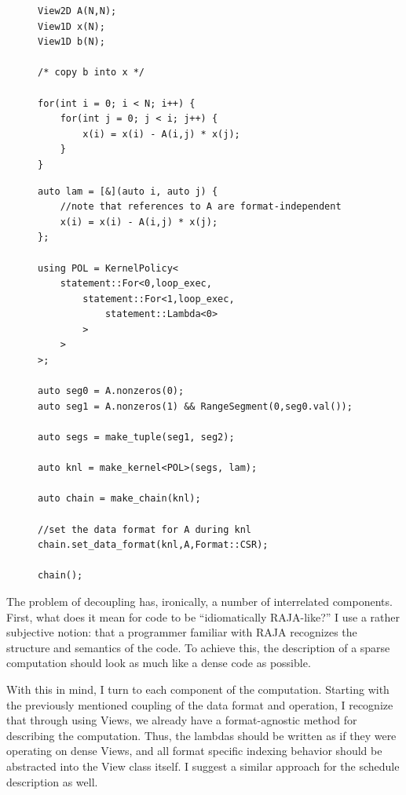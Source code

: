 \documentclass{article}
\begin{document}
\begin{figure}
\begin{lstlisting}[label={ForwardSolveC},caption={C-like implementation of forward substitution using Views}]
View2D A(N,N);
View1D x(N);
View1D b(N);

/* copy b into x */

for(int i = 0; i < N; i++) {
    for(int j = 0; j < i; j++) {
        x(i) = x(i) - A(i,j) * x(j);
    }
}
\end{lstlisting}
\end{figure}


\begin{figure}
\begin{lstlisting}[caption={Possible RAJA implementation of forward substitution.},label={ForwardSolveRAJA}]
auto lam = [&](auto i, auto j) {
    //note that references to A are format-independent
    x(i) = x(i) - A(i,j) * x(j);
};

using POL = KernelPolicy<
    statement::For<0,loop_exec,
        statement::For<1,loop_exec,
            statement::Lambda<0>
        >
    >
>;

auto seg0 = A.nonzeros(0);
auto seg1 = A.nonzeros(1) && RangeSegment(0,seg0.val());

auto segs = make_tuple(seg1, seg2);

auto knl = make_kernel<POL>(segs, lam);

auto chain = make_chain(knl);

//set the data format for A during knl
chain.set_data_format(knl,A,Format::CSR);

chain();

\end{lstlisting}
\end{figure}

The problem of decoupling has, ironically, a number of interrelated components.
First, what does it mean for code to be \enquote{idiomatically RAJA-like?}
I use a rather subjective notion: that a programmer familiar with RAJA recognizes the structure and semantics of the code. 
To achieve this, the description of a sparse computation should look as much like a dense code as possible. 

With this in mind, I turn to each component of the computation.
Starting with the previously mentioned coupling of the data format and operation, I recognize that through using Views, we already have a format-agnostic method for describing the computation. 
Thus, the lambdas should be written as if they were operating on dense Views, and all format specific indexing behavior should be abstracted into the View class itself. 
I suggest a similar approach for the schedule description as well.
\end{document}
